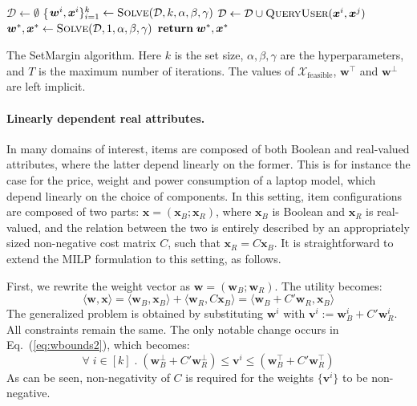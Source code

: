 \documentclass{article}
\renewcommand\[{\begin{equation}}
\renewcommand\]{\end{equation}}
\newcommand{\calvar}[1]{\ensuremath{\mathcal{#1}}}
\newcommand{\calD}{\calvar{D}}
\newcommand{\calX}{\calvar{X}}
\newcommand{\vecvar}[1]{\ensuremath{\boldsymbol{#1}}}
\newcommand{\vv}{\vecvar{v}}
\newcommand{\vw}{\vecvar{w}}
\newcommand{\vx}{\vecvar{x}}
\begin{document}
\begin{algorithm}
{\footnotesize
\begin{algorithmic}[1]
        \State $\calD \gets \emptyset$
            \State \{$\vw^{i}, \vx^{i}\}_{i=1}^k \gets \text{{\sc Solve}}(\calD, k, \alpha, \beta, \gamma)$
            \For{$\vx^{i},\vx^{j} \in \{ \vx^{1}, \ldots, \vx^{k} \} \; \text{{\bf s.t.}} \; i < j$}
                \State $\calD \gets \calD \cup \text{{\sc QueryUser}}(\vx^{i},\vx^{j})$
            \EndFor
        \EndFor
        \State $\vw^*, \vx^* \gets \text{{\sc Solve}}(\calD, 1, \alpha, \beta, \gamma)$
        \State ${\bf return}\; \vw^*, \vx^*$
    \EndProcedure
\end{algorithmic}
}
\caption{\label{alg:setmargin} The {\sc SetMargin} algorithm. Here $k$ is the
set size, $\alpha,\beta,\gamma$ are the hyperparameters, and $T$ is the maximum
number of iterations. The values of $\calX_\text{feasible}$, $\vw^\top$ and
$\vw^\bot$ are left implicit.}
\end{algorithm}

\paragraph{Linearly dependent real attributes.} In many domains of interest,
items are composed of both Boolean and real-valued attributes, where the latter
depend linearly  on the former. This is for instance the case for the price,
weight and power consumption of a laptop model, which depend linearly on the
choice of components.
%
In this setting, item configurations are composed of two parts: $\vx =
(\vx_B;\vx_R)$, where $\vx_B$ is Boolean and $\vx_R$ is real-valued, and the
relation between the two is entirely described by an appropriately sized
non-negative cost matrix $C$, such that $\vx_R = C \vx_B$. It is
straightforward to extend the MILP formulation to this setting, as follows.

First, we rewrite the weight vector as $\vw = (\vw_B;\vw_R)$. The utility
becomes:
%
$$ \langle \vw, \vx \rangle = \langle \vw_B, \vx_B \rangle + \langle \vw_R, C \vx_B \rangle = \langle \vw_B + C' \vw_R, \vx_B \rangle $$
%
The generalized problem is obtained by substituting $\vw^i$ with $\vv^i :=
\vw_B^i + C' \vw_R^i$.  All constraints remain the same. The only notable
change occurs in Eq.~(\ref{eq:wbounds2}), which becomes:
%
$$ \forall \; i \in [k] \;.\; (\vw_B^\bot + C' \vw_R^\bot) \le \vv^i \le (\vw_B^\top + C' \vw_R^\top)$$
%
As can be seen, non-negativity of $C$ is required for the weights $\{\vv^i\}$
to be non-negative.
\end{document}
